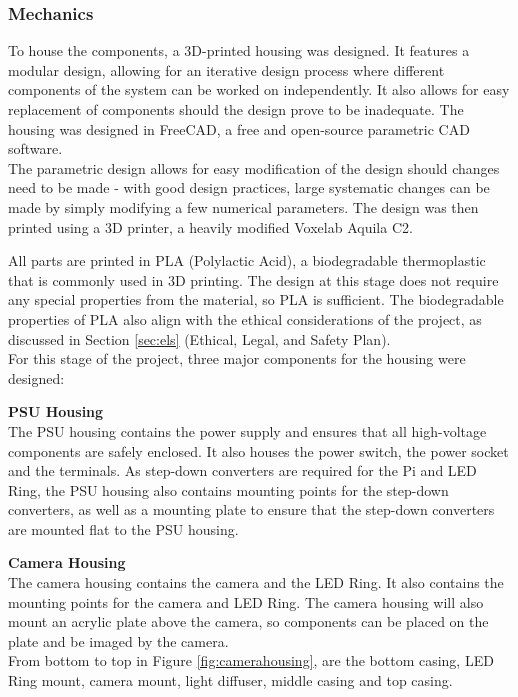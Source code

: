 \subsubsection{Mechanics} \label{sec:mechanics}
To house the components, a 3D-printed housing was designed. It features a modular design, allowing for an iterative design process
where different components of the system can be worked on independently. It also allows for easy replacement of components
should the design prove to be inadequate. The housing was designed in FreeCAD\cite{freecad}, a free and open-source parametric CAD software. \\
The parametric design allows for easy modification of the design should changes need to be made -
with good design practices, large systematic changes can be made by simply modifying a few numerical parameters.
The design was then printed using a 3D printer, a heavily modified Voxelab Aquila C2. 

All parts are printed in PLA (Polylactic Acid), a biodegradable thermoplastic that is commonly used in 3D printing\cite{Ranakoti2022}. The design
at this stage does not require any special properties from the material, so PLA is sufficient. The biodegradable properties of PLA
also align with the ethical considerations of the project, as discussed in Section \ref{sec:els} (Ethical, Legal, and Safety Plan). \\

For this stage of the project, three major components for the housing were designed:

\noindent
\textbf{PSU Housing} \\
The PSU housing contains the power supply and ensures that all high-voltage components are safely enclosed.
It also houses the power switch, the power socket and the terminals. As step-down converters are required for the Pi and LED Ring,
the PSU housing also contains mounting points for the step-down converters, as well as a mounting plate to ensure that the step-down converters
are mounted flat to the PSU housing.

\noindent
\textbf{Camera Housing}
\label{sec:camerahousing} \\
The camera housing contains the camera and the LED Ring. It also contains the mounting points for the camera and LED Ring.
The camera housing will also mount an acrylic plate above the camera, so components can be placed on the plate and be imaged by the camera. \\
From bottom to top in Figure \ref{fig:camerahousing}, are the bottom casing, LED Ring mount, camera mount, light diffuser, middle casing and
top casing. \\

